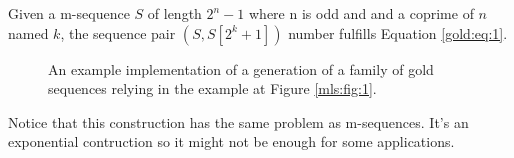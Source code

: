 \begin{property}
  Given a m-sequence $S$ of length $2^n - 1$ where n is odd and and a
  coprime of $n$ named $k$, the sequence pair $(S, S[2^{k} + 1])$ number
  fulfills Equation \eqref{gold:eq:1}.
\end{property}

\begin{figure}[ht!]
  \caption{An example implementation of a generation of a family of gold
  sequences relying in the example at Figure \ref{mls:fig:1}.}
  \label{}
\end{figure}

Notice that this construction has the same problem as m-sequences. It's
an exponential contruction so it might not be enough for some applications.
